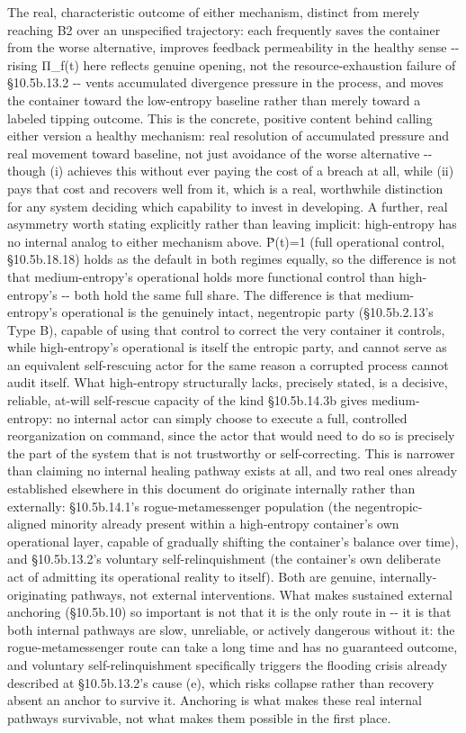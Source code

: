 \documentclass[
]{article}
\begin{document}
The real, characteristic outcome of either mechanism, distinct from
merely reaching B2 over an unspecified trajectory: each frequently saves
the container from the worse alternative, improves feedback permeability
in the healthy sense -\/- rising Π\_f(t) here reflects genuine opening,
not the resource-exhaustion failure of §10.5b.13.2 -\/- vents
accumulated divergence pressure in the process, and moves the container
toward the low-entropy baseline rather than merely toward a labeled
tipping outcome. This is the concrete, positive content behind calling
either version a healthy mechanism: real resolution of accumulated
pressure and real movement toward baseline, not just avoidance of the
worse alternative -\/- though (i) achieves this without ever paying the
cost of a breach at all, while (ii) pays that cost and recovers well
from it, which is a real, worthwhile distinction for any system deciding
which capability to invest in developing. A further, real asymmetry
worth stating explicitly rather than leaving implicit: high-entropy has
no internal analog to either mechanism above. Ṗ(t)=1 (full operational
control, §10.5b.18.18) holds as the default in both regimes equally, so
the difference is not that medium-entropy's operational holds more
functional control than high-entropy's -\/- both hold the same full
share. The difference is that medium-entropy's operational is the
genuinely intact, negentropic party (§10.5b.2.13's Type B), capable of
using that control to correct the very container it controls, while
high-entropy's operational is itself the entropic party, and cannot
serve as an equivalent self-rescuing actor for the same reason a
corrupted process cannot audit itself. What high-entropy structurally
lacks, precisely stated, is a decisive, reliable, at-will self-rescue
capacity of the kind §10.5b.14.3b gives medium-entropy: no internal
actor can simply choose to execute a full, controlled reorganization on
command, since the actor that would need to do so is precisely the part
of the system that is not trustworthy or self-correcting. This is
narrower than claiming no internal healing pathway exists at all, and
two real ones already established elsewhere in this document do
originate internally rather than externally: §10.5b.14.1's
rogue-metamessenger population (the negentropic-aligned minority already
present within a high-entropy container's own operational layer, capable
of gradually shifting the container's balance over time), and
§10.5b.13.2's voluntary self-relinquishment (the container's own
deliberate act of admitting its operational reality to itself). Both are
genuine, internally-originating pathways, not external interventions.
What makes sustained external anchoring (§10.5b.10) so important is not
that it is the only route in -\/- it is that both internal pathways are
slow, unreliable, or actively dangerous without it: the
rogue-metamessenger route can take a long time and has no guaranteed
outcome, and voluntary self-relinquishment specifically triggers the
flooding crisis already described at §10.5b.13.2's cause (e), which
risks collapse rather than recovery absent an anchor to survive it.
Anchoring is what makes these real internal pathways survivable, not
what makes them possible in the first place.
\end{document}
